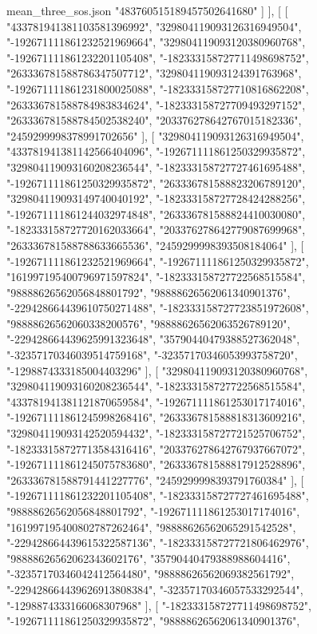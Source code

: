 \begin{filecontents*}[overwrite]{mean_three_sos.json}
    "483760515189457502641680"
   ]
  ],
  [
   [
    "433781941381103581396992",
    "329804119093126316949504",
    "-192671111861232521969664",
    "329804119093120380960768",
    "-192671111861232201105408",
    "-182333158727711498698752",
    "263336781588786347507712",
    "329804119093124391763968",
    "-192671111861231800025088",
    "-182333158727710816862208",
    "263336781588784983834624",
    "-182333158727709493297152",
    "263336781588784502538240",
    "203376278642767015182336",
    "2459299998378991702656"
   ],
   [
    "329804119093126316949504",
    "433781941381142566404096",
    "-192671111861250329935872",
    "329804119093160208236544",
    "-182333158727727461695488",
    "-192671111861250329935872",
    "263336781588823206789120",
    "329804119093149740040192",
    "-182333158727728424288256",
    "-192671111861244032974848",
    "263336781588824410030080",
    "-182333158727720162033664",
    "203376278642779087699968",
    "263336781588788633665536",
    "2459299998393508184064"
   ],
   [
    "-192671111861232521969664",
    "-192671111861250329935872",
    "161997195400796971597824",
    "-182333158727722568515584",
    "98888626562056848801792",
    "98888626562061340901376",
    "-229428664439610750271488",
    "-182333158727723851972608",
    "98888626562060338200576",
    "98888626562063526789120",
    "-229428664439625991323648",
    "35790440479388527362048",
    "-32357170346039514759168",
    "-32357170346053993758720",
    "-1298874333185004403296"
   ],
   [
    "329804119093120380960768",
    "329804119093160208236544",
    "-182333158727722568515584",
    "433781941381121870659584",
    "-192671111861253017174016",
    "-192671111861245998268416",
    "263336781588818313609216",
    "329804119093142520594432",
    "-182333158727721525706752",
    "-182333158727713584316416",
    "203376278642767937667072",
    "-192671111861245075783680",
    "263336781588817912528896",
    "263336781588791441227776",
    "2459299998393791760384"
   ],
   [
    "-192671111861232201105408",
    "-182333158727727461695488",
    "98888626562056848801792",
    "-192671111861253017174016",
    "161997195400802787262464",
    "98888626562065291542528",
    "-229428664439615322587136",
    "-182333158727721806462976",
    "98888626562062343602176",
    "35790440479388988604416",
    "-32357170346042412564480",
    "98888626562069382561792",
    "-229428664439626913808384",
    "-32357170346057533292544",
    "-1298874333166068307968"
   ],
   [
    "-182333158727711498698752",
    "-192671111861250329935872",
    "98888626562061340901376",

\end{filecontents*}
